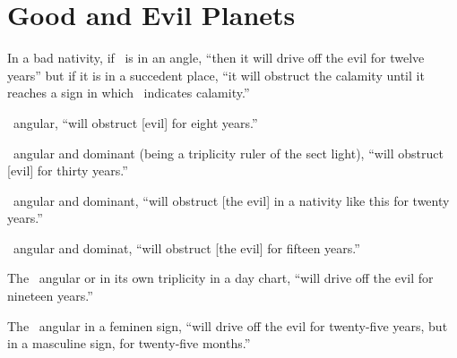 \section{Good and Evil Planets}
In a bad nativity, if \Jupiter\, is in an angle, ``then it will drive off the evil for twelve years'' but if it is in a succedent place, ``it will obstruct  the calamity until it reaches a sign in which \Jupiter\, indicates calamity.''

\Venus\, angular, ``will obstruct [evil] for eight years.''

\Saturn\, angular and dominant (being a triplicity ruler of the sect light), ``will obstruct [evil] for thirty years.''

\Mercury\, angular and dominant, ``will obstruct [the evil] in a nativity like this for twenty years.''

\Mars\, angular and dominat, ``will obstruct [the evil] for fifteen years.''

The \Sun\, angular or in its own triplicity in a day chart, ``will drive off the evil for nineteen years.''

The \Moon\, angular in a feminen sign, ``will drive off the evil for twenty-five years, but in a masculine sign, for twenty-five months.''
